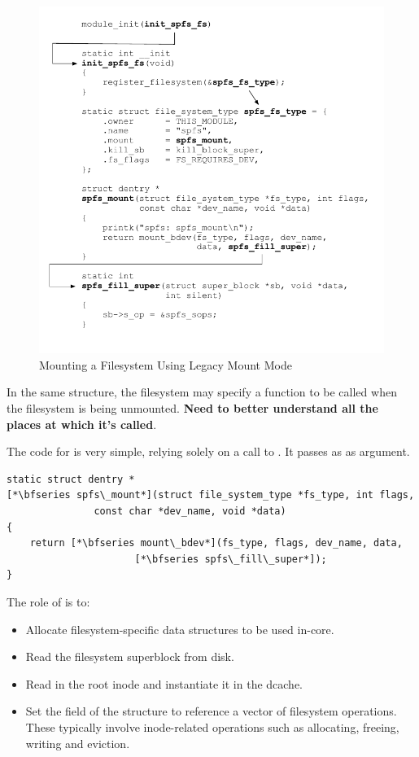 \begin{figure}[h]
	\includegraphics[scale=0.8]{figures/super_operations.pdf}
	\centering
	\caption{Mounting a Filesystem Using Legacy Mount Mode}
	\label{fig:super-operations}
\end{figure}

In the same structure, the filesystem may specify a function to be called when the filesystem is being unmounted. \textbf{Need to better understand all the places at which it's called}.

The code for  is very simple, relying solely on a call to . It passes  as as argument.

\begin{lstlisting}
static struct dentry *
[*\bfseries spfs\_mount*](struct file_system_type *fs_type, int flags, 
			   const char *dev_name, void *data)
{
    return [*\bfseries mount\_bdev*](fs_type, flags, dev_name, data, 
                      [*\bfseries spfs\_fill\_super*]);
}
\end{lstlisting}

\noindent
The role of  is to:

\begin{itemize}
	\item Allocate filesystem-specific data structures to be used in-core.
	\item Read the filesystem superblock from disk.
	\item Read in the root inode and instantiate it in the dcache.
	\item Set the  field of the  structure to reference a vector of filesystem operations. These
		typically involve inode-related operations such as allocating, freeing, writing and eviction.
\end{itemize}

